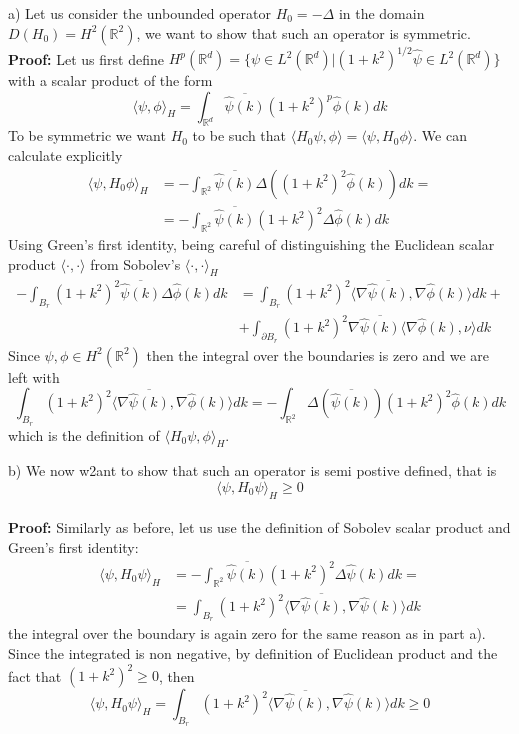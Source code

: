 \documentclass{article}
\newcommand{\R}{\mathbb{R}}
\newcommand{\1}{1\!\!1}
\newcommand{\proof}{\\ \textbf{Proof: }}
\begin{document}
a) Let us consider the unbounded operator $H_0 = -\Delta$ in the domain $D(H_0) = H^2(\R^2)$, we want to show that such an operator is symmetric.
\proof Let us first define $H^p (\R^d) = \{ \psi \in L^2(\R^d) | (1+k^2)^{1/2} \hat \psi \in L^2(\R^d) \}$ with a scalar product of the form
\[
    \langle \psi, \phi \rangle_H = \int_{\R^d} \overline{\hat \psi (k)} (1+k^2)^p \hat \phi (k) dk
\]
To be symmetric we want $H_0$ to be such that $\langle H_0 \psi , \phi \rangle = \langle \psi, H_0 \phi \rangle$. We can calculate explicitly
\[
    \begin{split}
        \langle \psi , H_0 \phi \rangle_H &= - \int_{\R^2} \overline{\hat \psi (k)} \Delta ((1+k^2)^2 \hat \phi (k)) dk = \\
        & = - \int_{\R^2} \overline{\hat \psi (k)} (1+k^2)^2 \Delta \hat \phi (k) dk
    \end{split}
\]
Using Green's first identity, being careful of distinguishing the Euclidean scalar product $\langle \cdot, \cdot \rangle$ from Sobolev's $\langle \cdot, \cdot\rangle_H$
\[
    \begin{split}
        - \int_{B_r} (1+k^2)^2 \overline{\hat \psi (k)} \Delta \hat \phi (k) dk &= \int_{B_r} (1+k^2)^2 \langle \nabla \overline{\hat \psi (k)}, \nabla \hat \phi (k) \rangle dk +\\
        &+ \int_{\partial B_r} (1+k^2)^2 \nabla \overline{\hat \psi (k)} \langle \nabla \hat \phi (k), \nu \rangle dk
    \end{split}
\]
Since $\psi, \phi \in H^2(\R^2)$ then the integral over the boundaries is zero and we are left with 
\[
    \int_{B_r} (1+k^2)^2 \langle \nabla \overline{\hat \psi (k)}, \nabla \hat \phi (k) \rangle dk = - \int_{\R^2} \Delta(\overline{\hat \psi (k)}) (1+k^2)^2 \hat \phi (k) dk
\]
which is the definition of $\langle H_0 \psi,  \phi \rangle_H$.

b) We now w2ant to show that such an operator is semi postive defined, that is 
\[
    \langle  \psi, H_0  \psi \rangle_H \geq 0
\]
\proof Similarly as before, let us use the definition of Sobolev scalar product and Green's first identity:
\[
    \begin{split}
        \langle  \psi, H_0  \psi \rangle_H & = - \int_{\R^2} \overline{\hat \psi (k)} (1+k^2)^2 \Delta \hat \psi (k) dk = \\
        & = \int_{B_r} (1+k^2)^2 \langle \nabla \overline{\hat \psi (k)}, \nabla \hat \psi (k) \rangle dk
    \end{split}
\]
the integral over the boundary is again zero for the same reason as in part a). Since the integrated is non negative, by definition of Euclidean product and the fact that $(1+k^2)^2\geq0$, then
\[
   \langle  \psi, H_0  \psi \rangle_H = \int_{B_r} (1+k^2)^2 \langle \nabla \overline{\hat \psi (k)}, \nabla \hat \psi (k) \rangle dk \geq 0
\]
\end{document}
